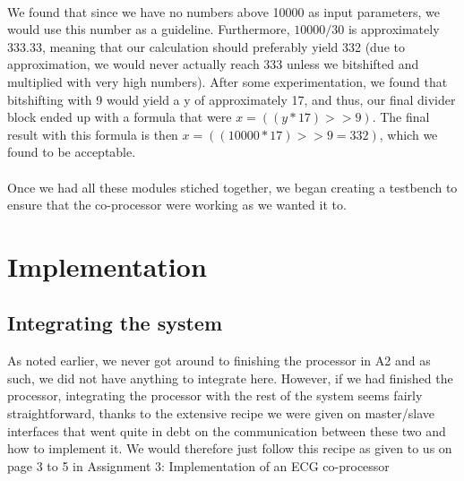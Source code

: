 \documentclass[12pt,a4paper]{article}
\begin{document}
	\\
	We found that since we have no numbers above 10000 as input parameters, we would use this number as a guideline. Furthermore, $10000/30$ is approximately 333.33, meaning that our calculation should preferably yield 332 (due to approximation, we would never actually reach 333 unless we bitshifted and multiplied with very high numbers). After some experimentation, we found that bitshifting with 9 would yield a y of approximately 17, and thus, our final divider block ended up with a formula that were $x=((y*17)>>9)$. The final result with this formula is then $x=((10000*17)>>9=332)$, which we found to be acceptable.\\
	\\
	Once we had all these modules stiched together, we began creating a testbench to ensure that the co-processor were working as we wanted it to.
\section{Implementation}
\subsection{Integrating the system}
	As noted earlier, we never got around to finishing the processor in A2 and as such, we did not have anything to integrate here. However, if we had finished the processor, integrating the processor with the rest of the system seems fairly straightforward, thanks to the extensive recipe we were given on master/slave interfaces that went quite in debt on the communication between these two and how to implement it. We would therefore just follow this recipe as given to us on page 3 to 5 in Assignment 3: Implementation of an ECG co-processor \cite{lamport94}
\end{document}
